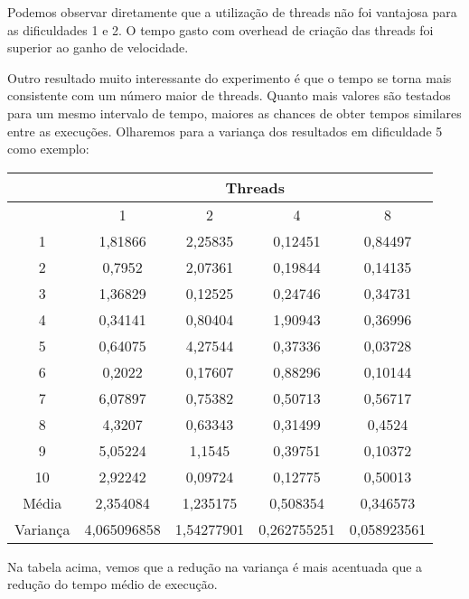 \documentclass[12pt]{article}
\begin{document}
Podemos observar diretamente que
a utilização de threads não foi vantajosa
para as dificuldades 1 e 2.
O tempo gasto com overhead de criação das threads
foi superior ao ganho de velocidade.

Outro resultado muito interessante do experimento
é que o tempo se torna mais consistente
com um número maior de threads.
Quanto mais valores são testados para um mesmo intervalo de tempo,
maiores as chances de obter tempos similares entre as execuções.
Olharemos para a variança dos resultados em dificuldade 5 como exemplo:

\hspace{9px}

\begin{tabular}{|c|c|c|c|c|}
	\hline
	& \multicolumn{4}{c|}{Threads}\\
	\hline
	& 1	& 2	& 4	& 8\\
	\hline
	1 & 1,81866	& 2,25835 & 0,12451	& 0,84497 \\
	\hline
	2 & 0,7952 & 2,07361 & 0,19844 & 0,14135 \\
	\hline
	3 & 1,36829 & 0,12525 & 0,24746 & 0,34731 \\
	\hline
	4 & 0,34141 & 0,80404 & 1,90943 & 0,36996 \\
	\hline
	5 & 0,64075 & 4,27544 & 0,37336 & 0,03728 \\
	\hline
	6 & 0,2022 & 0,17607 & 0,88296 & 0,10144 \\
	\hline
	7 & 6,07897 & 0,75382 & 0,50713 & 0,56717 \\
	\hline
	8 & 4,3207 & 0,63343 & 0,31499 & 0,4524 \\
	\hline
	9 & 5,05224 & 1,1545 & 0,39751 & 0,10372 \\
	\hline
	10 & 2,92242 & 0,09724 & 0,12775 & 0,50013 \\ 
	\hline
	Média & 2,354084 & 1,235175 & 0,508354 & 0,346573 \\
	\hline
	Variança & 4,065096858 & 1,54277901 & 0,262755251 & 0,058923561 \\
	\hline
\end{tabular}

\hspace{20px}

Na tabela acima, vemos que a redução na variança
é mais acentuada que a redução do tempo médio de execução.
\end{document}
